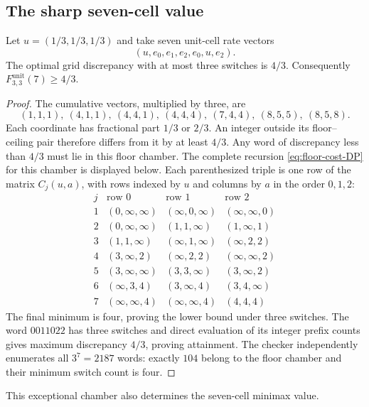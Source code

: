 \subsection{The sharp seven-cell value}
\begin{proposition}\label{prop:seven-cell-instance}
Let $u=(1/3,1/3,1/3)$ and take seven unit-cell rate vectors
\begin{equation}\label{eq:seven-cell-rates}
 (u,e_0,e_1,e_2,e_0,u,e_2).
\end{equation}
The optimal grid discrepancy with at most three switches is $4/3$.
Consequently $F^{\mathrm{unit}}_{3,3}(7)\ge4/3$.
\end{proposition}
\begin{proof}
The cumulative vectors, multiplied by three, are
\[
 (1,1,1),\ (4,1,1),\ (4,4,1),\ (4,4,4),\
 (7,4,4),\ (8,5,5),\ (8,5,8).
\]
Each coordinate has fractional part $1/3$ or $2/3$. An integer outside
its floor--ceiling pair therefore differs from it by at least $4/3$.
Any word of discrepancy less than $4/3$ must lie in this floor chamber.
The complete recursion \eqref{eq:floor-cost-DP} for this chamber is
displayed below. Each parenthesized triple is one row of the matrix
$C_j(u,a)$, with rows indexed by $u$ and columns by $a$ in the order
$0,1,2$:
\[
\begin{array}{c|ccc}
 j&\text{row }0&\text{row }1&\text{row }2\\\hline
1&(0,\infty,\infty)&(\infty,0,\infty)&(\infty,\infty,0)\\
2&(0,\infty,\infty)&(1,1,\infty)&(1,\infty,1)\\
3&(1,1,\infty)&(\infty,1,\infty)&(\infty,2,2)\\
4&(3,\infty,2)&(\infty,2,2)&(\infty,\infty,2)\\
5&(3,\infty,\infty)&(3,3,\infty)&(3,\infty,2)\\
6&(\infty,3,4)&(3,\infty,4)&(3,4,\infty)\\
7&(\infty,\infty,4)&(\infty,\infty,4)&(4,4,4)
\end{array}
\]
The final minimum is four, proving the lower bound under three switches.
The word $0011022$ has three switches and direct evaluation of its integer
prefix counts gives maximum discrepancy $4/3$, proving attainment.
The checker independently enumerates all $3^7=2187$ words: exactly
$104$ belong to the floor chamber and their minimum switch count is four.
\end{proof}
This exceptional chamber also determines the seven-cell minimax value.

